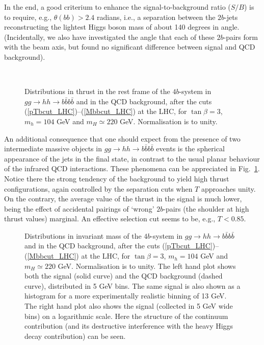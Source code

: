 In the end, a good criterium to enhance the signal-to-background ratio
($S/B$) is to require, e.g., $\theta({bb})>2.4$ radians, i.e., a
separation between the $2b$-jets reconstructing the lightest Higgs
boson mass of about 140 degrees in angle. (Incidentally, we also have 
investigated the angle that each of these $2b$-pairs form with the
beam axis, but found no significant difference between signal and QCD
background).

\begin{figure}[!ht]
~\hskip2.5cm
\caption{
  Distributions in thrust in the rest frame of the $4b$-system
  in $gg\to hh\to b\bar b b\bar b$ and in the QCD background, after
  the cuts (\ref{pTbcut_LHC})--(\ref{Mbbcut_LHC}) at the LHC, for
  $\tan\beta=3$, $m_h=104$ GeV and $m_H\simeq220$ GeV.  Normalisation
  is to unity.}
\label{fig:thrust_LHC}
\end{figure}

An additional consequence that one should expect from the presence
of two intermediate massive objects in $gg\to hh\to b\bar b b\bar b$
events is the spherical appearance of the jets in the final
state, in contrast to the usual planar behaviour of the infrared
QCD interactions. These phenomena can be appreciated in
Fig.~\ref{fig:thrust_LHC}. Notice there the strong tendency
of the background to yield high thrust configurations, again controlled
by the separation cuts when $T$ approaches unity.
On the contrary, the average value of the thrust in the signal
is much lower, being the effect of accidental pairings of `wrong'
$2b$-pairs (the shoulder at high thrust values) marginal. An effective
selection cut seems to be, e.g., $T<0.85$.

\begin{figure}[!ht]
\begin{minipage}[b]{.495\linewidth}
\centering{}
\end{minipage}\hfill\hfill
\begin{minipage}[b]{.495\linewidth}
\centering{}
\end{minipage}
\caption{ Distributions in invariant mass of the $4b$-system
  in $gg\to hh\to b\bar b b\bar b$ and in the QCD background, after
  the cuts (\ref{pTbcut_LHC})--(\ref{Mbbcut_LHC}) at the LHC, for
  $\tan\beta=3$, $m_h=104$ GeV and $m_H\simeq220$ GeV.  Normalisation
  is to unity. The left hand plot shows both the signal (solid curve)
  and the QCD background (dashed curve), distributed in 5 GeV bins.
  The same signal is also shown as a histogram for a more
  experimentally realistic binning of 13 GeV. The right hand plot also
  shows the signal (collected in 5 GeV wide bins) on a logarithmic
  scale. Here the structure of the continuum contribution (and its
  destructive interference with the heavy Higgs decay contribution)
  can be seen.}
\label{fig:Mbbbb_LHC}
\vspace*{-3mm}
\end{figure}

